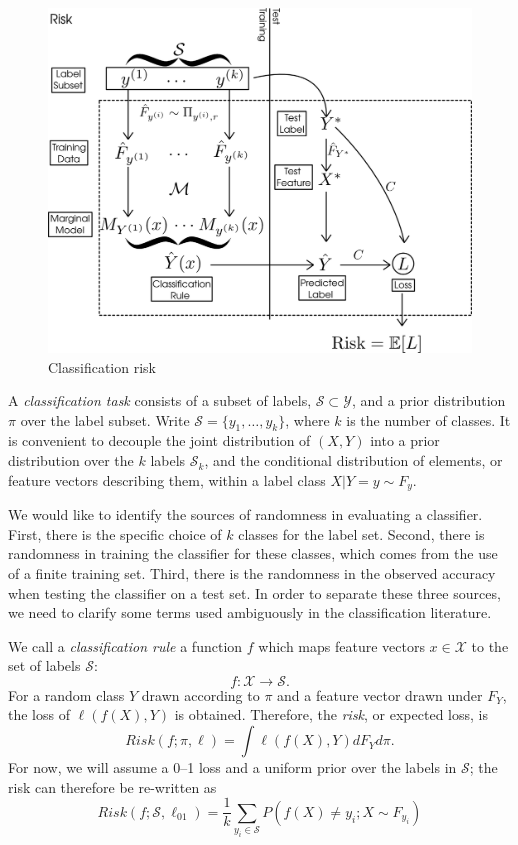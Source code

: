 \documentclass[12pt]{article}
\begin{document}
\begin{figure}[h]
\centering
\includegraphics[scale = 0.4]{extrapolation_figures/risk.png}
\caption{Classification risk}\label{fig:risk}
\end{figure}

A \emph{classification task} consists of a subset of labels,
$\mathcal{S} \subset \mathcal{Y}$, and a prior distribution $\pi$ over
the label subset. Write $\mathcal{S}=\{y_1,\hdots, y_k\}$, where $k$
is the number of classes.  It is convenient to decouple the joint distribution of $(X,Y)$ into a prior distribution over the $k$ labels $\mathcal{S}_k$, and the conditional distribution of elements, or feature vectors describing them, within a label class $X|Y=y \sim F_y$.

We would like to identify the sources of randomness in evaluating a classifier. 
First, there is the specific choice of $k$ classes for the label set. Second, there is randomness in training the classifier for these classes, which comes from the use of a finite training set. Third, there is the randomness in the observed accuracy when testing the classifier on a test set. In order to separate these three sources, we need to clarify some terms used ambiguously in the classification literature. 

We call a \emph{classification rule} a
function $f$ which maps feature vectors
$x \in \mathcal{X}$ to the set of labels $\mathcal{S}$:
\[
f: \mathcal{X} \to \mathcal{S}.
\]
For a random class $Y$ drawn according to $\pi$ 
and a feature vector drawn under $F_Y$, the loss of $\ell(f(X),Y)$ is obtained.
Therefore, the \emph{risk}, or expected loss, is 
\[Risk(f;\pi,\ell) = \int \ell(f(X),Y)dF_Y d\pi .\]
For now, we will assume a 0--1 loss and a uniform prior over the labels in $\mathcal{S}$; the risk can therefore be re-written as
\[Risk(f;\mathcal{S},\ell_{01}) = \frac{1}{k}\sum_{y_i\in \mathcal{S}}P(f(X)\neq y_i ; X\sim F_{y_i} )   \]
\end{document}
